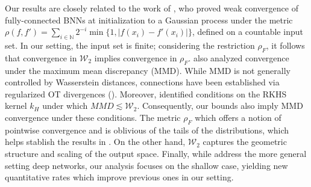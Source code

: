 \documentclass{article}
\theoremstyle{definition}
\theoremstyle{remark}
\numberwithin{equation}{section}
\begin{document}
Our results are closely related to the work of \cite{Matthews2018GaussianPB}, who proved weak convergence of fully-connected BNNs at initialization to a Gaussian process under the metric 
$\rho(f,f') = \sum_{i \in \mathbb{N}} 2^{-i} \min\{1, |f(x_i)-f'(x_i)|\}$, defined on a countable input set. 
In our setting, the input set is finite; considering the restriction $\rho_F$, it follows that convergence in $\mathcal{W}_2$ implies convergence in $\rho_F$. 
\cite{Matthews2018GaussianPB} also analyzed convergence under the maximum mean discrepancy (MMD). 
While MMD is not generally controlled by Wasserstein distances, connections have been established via regularized OT divergences (\cite{Feydy19,nietert2021smooth}).
Moreover, \cite{vayer} identified conditions on the RKHS kernel $k_H$ under which $MMD \lesssim \mathcal{W}_2$. 
Consequently, our bounds also imply MMD convergence under these conditions. 
The metric $\rho_F$ which offers a notion of pointwise convergence and is oblivious of the tails of the distributions, which helps stablish the results in \cite{Matthews2018GaussianPB}.  
On the other hand, $\mathcal{W}_2$ captures the geometric structure and scaling of the output space. 
Finally, while \cite{Matthews2018GaussianPB} address the more general setting deep networks, our analysis focuses on the shallow case, yielding new quantitative rates which improve previous ones in our setting.


\end{document}
